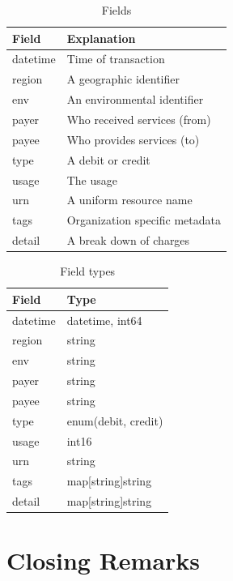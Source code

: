 \documentclass[10pt, a4paper, twocolumn]{article}
\begin{document}
    \begin{table}[H]
      \centering
      \begin{tabular}{ l|l }
        Field & Explanation \\
        \hline
        datetime & Time of transaction \\
        region & A geographic identifier \\
        env & An environmental identifier \\
        payer & Who received services (from) \\
        payee & Who provides services (to) \\
        type & A debit or credit \\
        usage & The usage \\
        urn & A uniform resource name \\
        tags & Organization specific metadata \\
        detail & A break down of charges \\
      \end{tabular}
      \caption{Fields}
      \label{table:2}
    \end{table}

    \begin{table}[H]
      \centering
      \begin{tabular}{ l|l }
        Field & Type \\
        \hline
        datetime & datetime, int64 \\
        region & string \\
        env & string \\
        payer & string \\
        payee & string \\
        type & enum(debit, credit) \\
        usage & int16 \\
        urn & string \\
        tags & map[string]string \\
        detail & map[string]string \\
      \end{tabular}
      \caption{Field types}
      \label{table:3}
    \end{table}

\section*{Closing Remarks}
\end{document}

